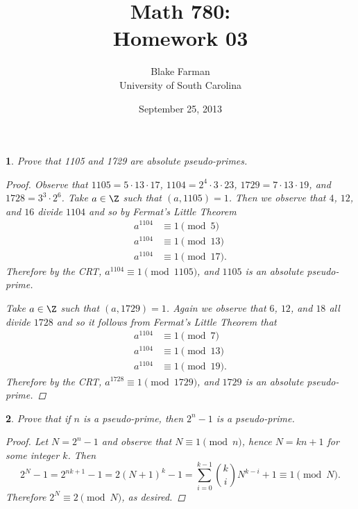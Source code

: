 \documentclass[10pt]{amsart}
\author{Blake Farman\\University of South Carolina}
\title{Math 780:\\Homework 03}
\date{September 25, 2013}
\begin{document}
\maketitle

\providecommand{\p}{\mathfrak{p}}
\providecommand{\m}{\mathfrak{m}}

\newtheorem{thm}{}
\newtheorem{lem}{Lemma}

\begin{thm}\label{ex1}
  Prove that 1105 and 1729 are absolute pseudo-primes.
  
  \begin{proof}
    Observe that $1105 = 5 \cdot 13 \cdot 17$, $1104 = 2^4 \cdot 3 \cdot 23$, $1729 = 7 \cdot 13 \cdot 19$, and $1728 = 3^3 \cdot 2^6$.
    Take $a \in \Z$ such that $(a, 1105) = 1$.
    Then we observe that $4$, $12$, and $16$ divide $1104$ and so by Fermat's Little Theorem
    \begin{eqnarray*}
      a^{1104} &\equiv 1 \pmod{5}\\
      a^{1104} &\equiv 1 \pmod{13}\\
      a^{1104} &\equiv 1 \pmod{17}.
    \end{eqnarray*}
    Therefore by the CRT, $a^{1104} \equiv 1 \pmod{1105}$, and $1105$ is an absolute pseudo-prime.
    
    Take $a \in \Z$ such that $(a, 1729) = 1$.
    Again we observe that $6$, $12$, and $18$ all divide $1728$ and so it follows from Fermat's Little Theorem that
    \begin{eqnarray*}
      a^{1104} &\equiv 1 \pmod{7}\\
      a^{1104} &\equiv 1 \pmod{13}\\
      a^{1104} &\equiv 1 \pmod{19}.
    \end{eqnarray*}
    Therefore by the CRT, $a^{1728} \equiv 1 \pmod{1729}$, and $1729$ is an absolute pseudo-prime.
  \end{proof}
\end{thm}

\begin{thm}\label{ex2}
  Prove that if $n$ is a pseudo-prime, then $2^n - 1$ is a pseudo-prime.

  \begin{proof}
    Let $N = 2^n - 1$ and observe that $N \equiv 1 \pmod{n}$, hence $N = kn + 1$ for some integer $k$.
    Then
    $$2^{N} - 1 = 2^{nk + 1} - 1 = 2(N+1)^k - 1 =\sum_{i=0}^{k-1} {k \choose i}N^{k-i} + 1 \equiv 1 \pmod{N}.$$
    Therefore $2^{N} \equiv 2 \pmod{N}$, as desired.
  \end{proof}
\end{thm}
\end{document}
